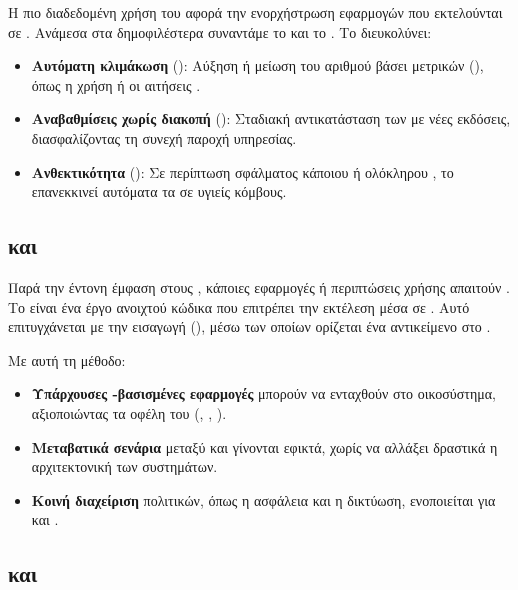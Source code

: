 Η πιο διαδεδομένη χρήση του  αφορά την ενορχήστρωση εφαρμογών που εκτελούνται σε . Ανάμεσα στα δημοφιλέστερα  συναντάμε το  και το . Το  διευκολύνει:
\begin{itemize}
  \item \textbf{Αυτόματη κλιμάκωση} (): Αύξηση ή μείωση του αριθμού  βάσει μετρικών (), όπως η χρήση  ή οι αιτήσεις .
  \item \textbf{Αναβαθμίσεις χωρίς διακοπή} (): Σταδιακή αντικατάσταση των  με νέες εκδόσεις, διασφαλίζοντας τη συνεχή παροχή υπηρεσίας.
  \item \textbf{Ανθεκτικότητα} (): Σε περίπτωση σφάλματος κάποιου  ή ολόκληρου , το  επανεκκινεί αυτόματα τα  σε υγιείς κόμβους.
\end{itemize}

\subsection{ και }

Παρά την έντονη έμφαση στους , κάποιες εφαρμογές ή περιπτώσεις χρήσης απαιτούν . Το  είναι ένα έργο ανοιχτού κώδικα που επιτρέπει την εκτέλεση  μέσα σε . Αυτό επιτυγχάνεται με την εισαγωγή  (), μέσω των οποίων ορίζεται ένα  αντικείμενο στο  .

Με αυτή τη μέθοδο:
\begin{itemize}
  \item \textbf{Υπάρχουσες -βασισμένες εφαρμογές} μπορούν να ενταχθούν στο  οικοσύστημα, αξιοποιώντας τα οφέλη του (, , ).
  \item \textbf{Μεταβατικά σενάρια} μεταξύ  και  γίνονται εφικτά, χωρίς να αλλάξει δραστικά η αρχιτεκτονική των συστημάτων.
  \item \textbf{Κοινή διαχείριση} πολιτικών, όπως η ασφάλεια και η δικτύωση, ενοποιείται για  και .
\end{itemize}

\subsection{ και }

